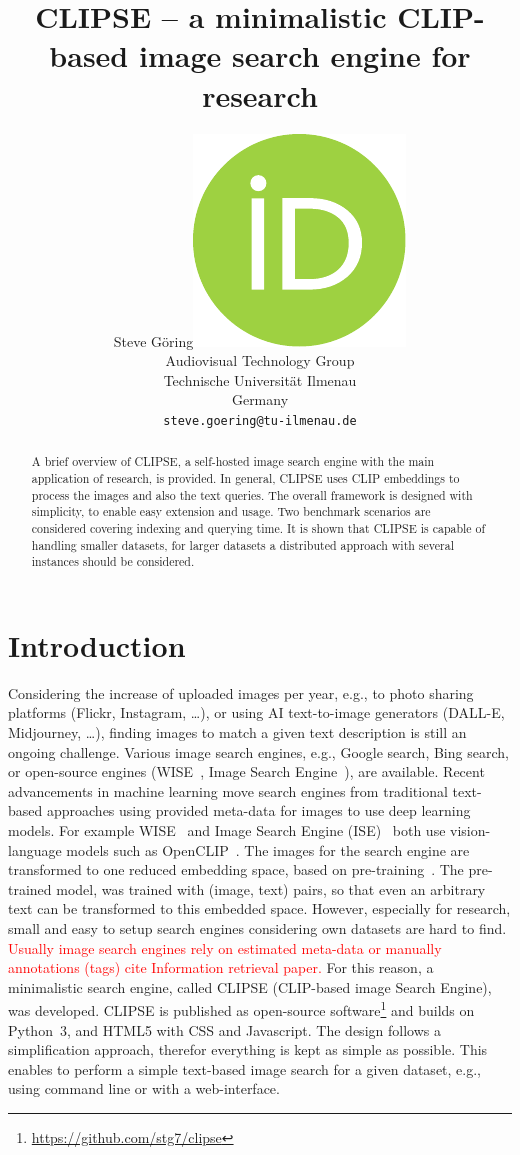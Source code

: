 \documentclass{article}
\title{CLIPSE -- a minimalistic CLIP-based image search engine for research}
\author{ Steve Göring\hspace{1mm}\href{https://orcid.org/0000-0001-6810-6969}{\includegraphics[scale=0.06]{orcid.pdf}}\\
    Audiovisual Technology Group\\
    Technische Universität Ilmenau\\
    Germany \\
    \texttt{steve.goering@tu-ilmenau.de} \\
}
\begin{document}
\maketitle

\begin{abstract}
A brief overview of CLIPSE, a self-hosted image search engine with the main application of research, is provided.
In general, CLIPSE uses CLIP embeddings to process the images and also the text queries.
The overall framework is designed with simplicity, to enable easy extension and usage.
Two benchmark scenarios are considered covering indexing and querying time.
It is shown that CLIPSE is capable of handling smaller datasets, for larger datasets a distributed approach with several instances should be considered.
\end{abstract}




\section{Introduction}
Considering the increase of uploaded images per year, e.g., to photo sharing platforms (Flickr, Instagram, \ldots), or using AI text-to-image generators (DALL-E, Midjourney, \ldots), finding images to match a given text description is still an ongoing challenge.
Various image search engines, e.g., Google search, Bing search, or open-source engines (WISE~\cite{wise}, Image Search Engine~\cite{ise}), are available.
Recent advancements in machine learning move search engines from traditional text-based approaches using provided meta-data for images to use deep learning models.
For example WISE~\cite{wise} and Image Search Engine (ISE)~\cite{ise} both use vision-language models such as OpenCLIP~\cite{ilharco_gabriel_2021_5143773,cherti2023reproducible,Radford2021LearningTV,schuhmann2022laionb}.
The images for the search engine are transformed to one reduced embedding space, based on pre-training~\cite{Radford2021LearningTV}.
The pre-trained model, was trained with (image, text) pairs, so that even an arbitrary text can be transformed to this embedded space.
However, especially for research, small and easy to setup search engines considering own datasets are hard to find.
\textcolor{red}{Usually image search engines rely on estimated meta-data or manually annotations (tags) cite Information retrieval paper.}
For this reason, a minimalistic search engine, called CLIPSE (CLIP-based image Search Engine), was developed.
CLIPSE is published as open-source software\footnote{\url{https://github.com/stg7/clipse}} and builds on Python~3, and HTML5 with CSS and Javascript.
The design follows a simplification approach, therefor everything is kept as simple as possible.
This enables to perform a simple text-based image search for a given dataset, e.g., using command line or with a web-interface.
\end{document}

